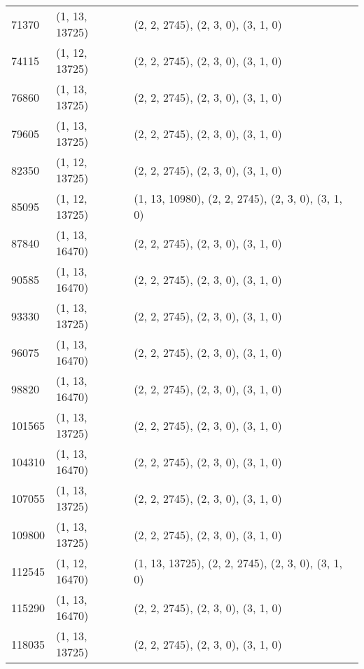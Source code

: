 \begin{longtable}{@{\extracolsep{\fill}}lll}
  71370              & (1, 13, 13725)              & (2, 2, 2745), (2, 3, 0), (3, 1, 0)                  \\
  74115              & (1, 12, 13725)              & (2, 2, 2745), (2, 3, 0), (3, 1, 0)                  \\
  76860              & (1, 13, 13725)              & (2, 2, 2745), (2, 3, 0), (3, 1, 0)                  \\
  79605              & (1, 13, 13725)              & (2, 2, 2745), (2, 3, 0), (3, 1, 0)                  \\
  82350              & (1, 12, 13725)              & (2, 2, 2745), (2, 3, 0), (3, 1, 0)                  \\
  85095              & (1, 12, 13725)              & (1, 13, 10980), (2, 2, 2745), (2, 3, 0), (3, 1, 0)  \\
  87840              & (1, 13, 16470)              & (2, 2, 2745), (2, 3, 0), (3, 1, 0)                  \\
  90585              & (1, 13, 16470)              & (2, 2, 2745), (2, 3, 0), (3, 1, 0)                  \\
  93330              & (1, 13, 13725)              & (2, 2, 2745), (2, 3, 0), (3, 1, 0)                  \\
  96075              & (1, 13, 16470)              & (2, 2, 2745), (2, 3, 0), (3, 1, 0)                  \\
  98820              & (1, 13, 16470)              & (2, 2, 2745), (2, 3, 0), (3, 1, 0)                  \\
  101565             & (1, 13, 13725)              & (2, 2, 2745), (2, 3, 0), (3, 1, 0)                  \\
  104310             & (1, 13, 16470)              & (2, 2, 2745), (2, 3, 0), (3, 1, 0)                  \\
  107055             & (1, 13, 13725)              & (2, 2, 2745), (2, 3, 0), (3, 1, 0)                  \\
  109800             & (1, 13, 13725)              & (2, 2, 2745), (2, 3, 0), (3, 1, 0)                  \\
  112545             & (1, 12, 16470)              & (1, 13, 13725), (2, 2, 2745), (2, 3, 0), (3, 1, 0)  \\
  115290             & (1, 13, 16470)              & (2, 2, 2745), (2, 3, 0), (3, 1, 0)                  \\
  118035             & (1, 13, 13725)              & (2, 2, 2745), (2, 3, 0), (3, 1, 0)                  \\

\end{longtable}
